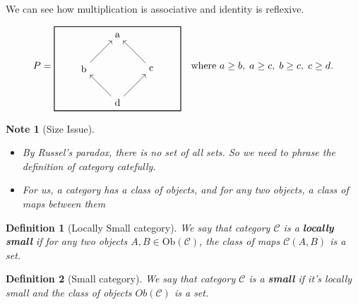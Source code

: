 \documentclass{article}
\newtheorem{definition}{Definition}[section]
\newtheorem{note}{Note}[section]
\begin{document}
    We can see how multiplication is associative and identity is reflexive.

    \[
        P =
        \begin{tikzpicture}
            [baseline={(current bounding box.center)}, scale=1.5]
            \draw[thick] (0,0) rectangle (3,2);

            \node (A) at (1.5, 1.8) {a};  %
            \node (B) at (0.7, 1) {b};    %
            \node (C) at (2.3, 1) {c};    %
            \node (D) at (1.5, 0.2) {d};  %

            \draw[->] (D) -- (B);  %
            \draw[->] (D) -- (C);  %
            \draw[->] (B) -- (A);  %
            \draw[->] (C) -- (A);  %
        \end{tikzpicture}
        \quad \text{where } a \geq b, \; a \geq c, \; b \geq c, \; c \geq d.
    \]


    \newpage


    \begin{note}[Size Issue]
        \newline
        \\

        \begin{itemize}
            \item By Russel's paradox, there is no set of all sets.
            So we need to phrase the definition of category catefully.
            \item \textit{For us}, a category has a class of objects, and for any two objects, a class of maps between them
        \end{itemize}
    \end{note}

    \vspace{0.2in}

    \begin{definition}[Locally Small category]
        We say that category $\mathcal{C}$ is a \textbf{locally small} if for any two objects $A, B \in \text{Ob}(\mathcal{C})$,
        the class of maps $\mathcal{C}(A, B)$ is a set.
    \end{definition}

    \vspace{0.2in}


    \begin{definition}[Small category]
        We say that category $\mathcal{C}$ is a \textbf{small} if it's locally small and the class of objects $Ob(\mathcal{C})$ is a set.
    \end{definition}
\end{document}
